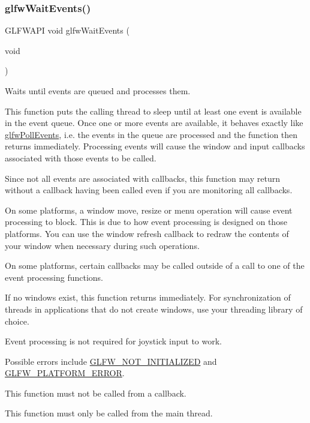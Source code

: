 \subsubsection{\texorpdfstring{glfw\+Wait\+Events()}{glfwWaitEvents()}}
{\footnotesize\ttfamily G\+L\+F\+W\+A\+PI void glfw\+Wait\+Events (\begin{DoxyParamCaption}\item[{void}]{ }\end{DoxyParamCaption})}



Waits until events are queued and processes them. 

This function puts the calling thread to sleep until at least one event is available in the event queue. Once one or more events are available, it behaves exactly like \hyperlink{group__window_ga872d16e4c77f58c0436f356255920cfc}{glfw\+Poll\+Events}, i.\+e. the events in the queue are processed and the function then returns immediately. Processing events will cause the window and input callbacks associated with those events to be called.

Since not all events are associated with callbacks, this function may return without a callback having been called even if you are monitoring all callbacks.

On some platforms, a window move, resize or menu operation will cause event processing to block. This is due to how event processing is designed on those platforms. You can use the window refresh callback to redraw the contents of your window when necessary during such operations.

On some platforms, certain callbacks may be called outside of a call to one of the event processing functions.

If no windows exist, this function returns immediately. For synchronization of threads in applications that do not create windows, use your threading library of choice.

Event processing is not required for joystick input to work.

Possible errors include \hyperlink{group__errors_ga2374ee02c177f12e1fa76ff3ed15e14a}{G\+L\+F\+W\+\_\+\+N\+O\+T\+\_\+\+I\+N\+I\+T\+I\+A\+L\+I\+Z\+ED} and \hyperlink{group__errors_gad44162d78100ea5e87cdd38426b8c7a1}{G\+L\+F\+W\+\_\+\+P\+L\+A\+T\+F\+O\+R\+M\+\_\+\+E\+R\+R\+OR}.

This function must not be called from a callback.

This function must only be called from the main thread.

